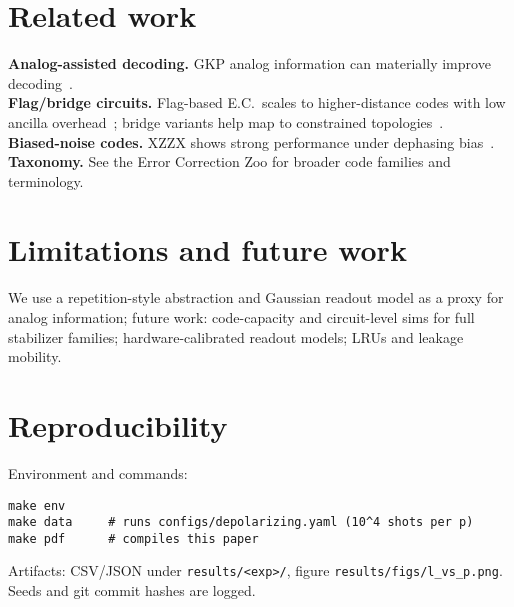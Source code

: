 \documentclass[11pt]{article}
\begin{document}
\section{Related work}
\textbf{Analog-assisted decoding.} GKP analog information can materially improve decoding~\cite{FukuiPRL2017,FukuiMBQC2017}. \\
\textbf{Flag/bridge circuits.} Flag-based E.C.\ scales to higher-distance codes with low ancilla overhead~\cite{ChamberlandBeverland2018}; bridge variants help map to constrained topologies~\cite{LaoAlmudever2020}. \\
\textbf{Biased-noise codes.} XZZX shows strong performance under dephasing bias~\cite{XZZXNatComms2021}. \\
\textbf{Taxonomy.} See the Error Correction Zoo for broader code families and terminology.

\section{Limitations and future work}
We use a repetition-style abstraction and Gaussian readout model as a proxy for analog information; future work: code-capacity and circuit-level sims for full stabilizer families; hardware-calibrated readout models; LRUs and leakage mobility.

\appendix
\section{Reproducibility}\label{sec:repro}
Environment and commands:
\begin{verbatim}
make env
make data     # runs configs/depolarizing.yaml (10^4 shots per p)
make pdf      # compiles this paper
\end{verbatim}
Artifacts: CSV/JSON under \texttt{results/<exp>/}, figure \texttt{results/figs/l\_vs\_p.png}. Seeds and git commit hashes are logged.
\end{document}
